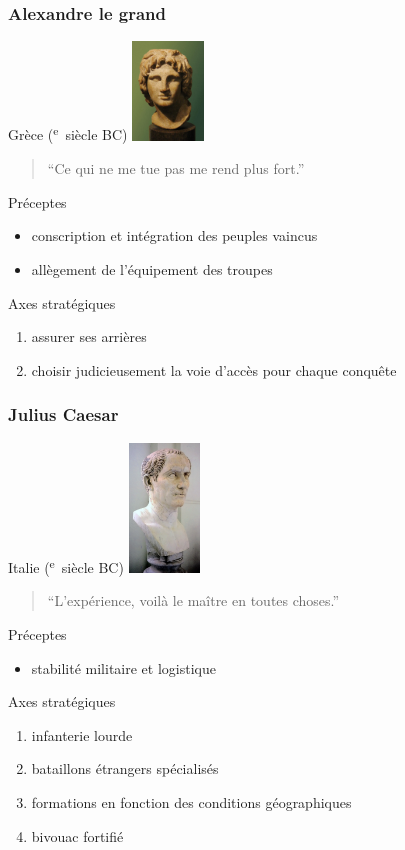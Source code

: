 \documentclass{article}
\newcommand{\cRM}[1]{\MakeUppercase{\romannumeral #1}}  %
\newcommand{\siecle}[1]{\cRM{#1}\textsuperscript{e}~siècle}
\begin{document}
\subsubsection{Alexandre le grand}
Grèce (\siecle{4} BC)
\includegraphics[trim=0cm 8cm 0cm 0cm, clip=true, width=1.9cm]{../ressources/AlexanderTheGreat_Bust}
\begin{quote}“Ce qui ne me tue pas me rend plus fort.”\end{quote}

Préceptes
\begin{itemize}
\item conscription et intégration des peuples vaincus
\item allègement de l'équipement des troupes
\end{itemize}
Axes stratégiques
\begin{enumerate}
\item assurer ses arrières
\item choisir judicieusement la voie d'accès pour chaque conquête
\end{enumerate}
\cite{alexander_the_great, alexandre_balkans}

\subsubsection{Julius Caesar}
Italie (\siecle{1} BC)
\includegraphics[trim=0cm 20cm 0cm 0cm, clip=true, width=1.9cm]{../ressources/cesare}
\begin{quote}“L’expérience, voilà le maître en toutes choses.”\end{quote}

Préceptes
\begin{itemize}
\item stabilité militaire et logistique
\end{itemize}
Axes stratégiques
\begin{enumerate}
\item infanterie lourde
\item bataillons étrangers spécialisés
\item formations en fonction des conditions géographiques
\item bivouac fortifié
\end{enumerate}
\cite{caesar_wiki, caesar_lacks}
\end{document}
